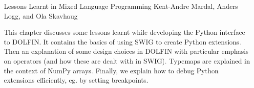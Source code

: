               {Lessons Learnt in Mixed Language Programming}
              {Kent-Andre Mardal, Anders Logg, and Ola Skavhaug}

\editornote{[mardal-2]}

This chapter discusses some lessons learnt while developing the Python
interface to DOLFIN. It contains the basics of using SWIG to create
Python extensions. Then an explanation of some design choices in
DOLFIN with particular emphasis on operators (and how these are dealt
with in SWIG). Typemaps are explained in the context of NumPy arrays.
Finally, we explain how to debug Python extensions efficiently, eg. by
setting breakpoints.
